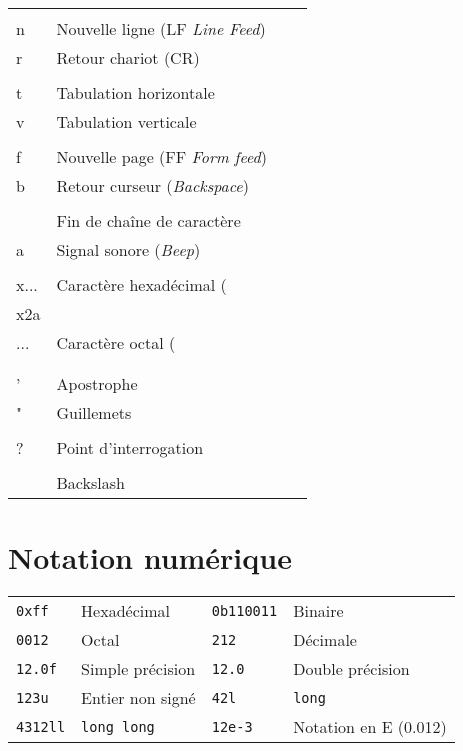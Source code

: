 \documentclass{article}
\newcommand{\cd}{\lstinline}
\begin{document}
\begin{multicols*}{3}
\begin{tabularx}{\linewidth}{
  >{\hsize=0.3\hsize}X%
  >{\hsize=1.7\hsize}X%
  >{\hsize=0.3\hsize}X%
  >{\hsize=1.7\hsize}X%
  }
  \cd{\\n}    & Nouvelle ligne (LF \emph{Line Feed})  & \cd{\\r}    & Retour chariot (CR) \\
  \cd{\\t}    & Tabulation horizontale & \cd{\\v}    & Tabulation verticale \\
  \cd{\\f}    & Nouvelle page (FF \emph{Form feed}) & \cd{\\b} & Retour curseur (\emph{Backspace}) \\
  \cd{\\0}    & Fin de chaîne de caractère          & \cd{\\a} & Signal sonore (\emph{Beep})  \\
  \cd{\\x...} & Caractère hexadécimal (\cd{\\x2a})  & \cd{\\0...} & Caractère octal (\cd{\\030}) \rule{0pt}{3ex} \\
  \cd{\\'}    & Apostrophe                          & \cd{\\"}    & Guillemets \\
  \cd{\\?}    & Point d'interrogation               & \cd{\\\\}    & Backslash \\
\end{tabularx}

\section*{Notation numérique}

\begin{tabularx}{\linewidth}{
  >{\hsize=0.4\hsize}X%
  >{\hsize=1.6\hsize}X%
  >{\hsize=0.4\hsize}X%
  >{\hsize=1.6\hsize}X%
  }

  \cd{0xff}    & Hexadécimal & \cd{0b110011}    & Binaire \\
  \cd{0012}    & Octal & \cd{212}    & Décimale \\
  \cd{12.0f}   & Simple précision & \cd{12.0}    & Double précision \\
  \cd{123u}    & Entier non signé       & \cd{42l}     & \cd{long} \\
  \cd{4312ll}  & \cd{long long} & \cd{12e-3} & Notation en E (0.012) \\
\end{tabularx}


\end{multicols*}
\end{document}
